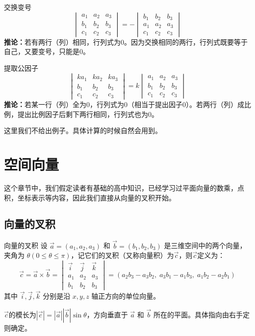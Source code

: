 \begin{theorem}{交换变号}{}
\[
\begin{vmatrix}
a_1 & a_2 & a_3 \\
b_1 & b_2 & b_3 \\
c_1 & c_2 & c_3
\end{vmatrix}
= -
\begin{vmatrix}
b_1 & b_2 & b_3 \\
a_1 & a_2 & a_3 \\
c_1 & c_2 & c_3
\end{vmatrix}
\]
\textbf{推论：}若有两行（列）相同，行列式为$0$。因为交换相同的两行，行列式既要等于自己，又要变号，只能是$0$。
\end{theorem}

\begin{theorem}{提取公因子}{}
\[
\begin{vmatrix}
ka_1 & ka_2 & ka_3 \\
b_1 & b_2 & b_3 \\
c_1 & c_2 & c_3
\end{vmatrix}
= k
\begin{vmatrix}
a_1 & a_2 & a_3 \\
b_1 & b_2 & b_3 \\
c_1 & c_2 & c_3
\end{vmatrix}
\]
\textbf{推论：}若某一行（列）全为$0$，行列式为$0$（相当于提出因子$0$）。若两行（列）成比例，提出比例因子后剩下两行相同，行列式也为$0$。
\end{theorem}

这里我们不给出例子。具体计算的时候自然会用到。

\section{空间向量}
这个章节中，我们假定读者有基础的高中知识，已经学习过平面向量的数乘，点积，坐标表示等内容，因此我们直接从向量的叉积开始。

\subsection{向量的叉积}
\begin{definition}{向量的叉积}{}
设 $\vec{a} = (a_1, a_2, a_3)$ 和 $\vec{b} = (b_1, b_2, b_3)$ 是三维空间中的两个向量，夹角为 $\theta (0 \leq \theta \leq \pi)$，记它们的叉积（又称向量积）为$\vec{c}$，则$\vec{c}$定义为：
\[\vec{c}=
\vec{a} \times \vec{b}
= \begin{vmatrix}
\vec{i} & \vec{j} & \vec{k} \\
a_1 & a_2 & a_3 \\
b_1 & b_2 & b_3
\end{vmatrix}
= (a_2 b_3 - a_3 b_2,\; a_3 b_1 - a_1 b_3,\; a_1 b_2 - a_2 b_1)
\]
其中 $\vec{i}, \vec{j}, \vec{k}$ 分别是沿 $x,y,z$ 轴正方向的单位向量。

$\vec{c}$的模长为$|\vec{c}|=|\vec{a}||\vec{b}|\sin\theta$，方向垂直于 $\vec{a}$ 和 $\vec{b}$ 所在的平面。具体指向由右手定则确定。
\end{definition}

